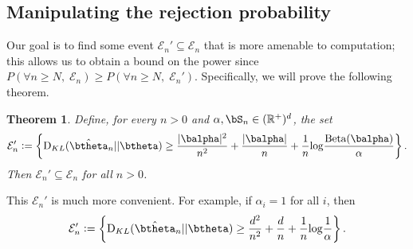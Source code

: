 \documentclass[11pt]{article}
\def\log{{\rm log}}
\newcommand{\Reals}{\mathbb R}
\newcommand{\Beta}{\mathrm{Beta}}
\newcommand{\KL}{\mathrm{D}_{KL}}
\newtheorem{thm}{Theorem}[section]
\newcommand{\df}{\vcentcolon=}
\begin{document}
\subsection{Manipulating the rejection probability}
Our goal is to find some event $\mathcal E_n'\subseteq \mathcal E_n$ that is more amenable to computation; this allows us to obtain a bound on the power since
$P(\forall n \geq N,\; \mathcal E_n) \geq P(\forall n \geq N,\; \mathcal E_n')$.
 Specifically, we will prove the following theorem.
\begin{thm}\label{thm:calEprime}
Define, for every $n>0$ and $\alpha, \bS_n\in(\Reals^+)^d$, the set
\begin{equation}
  \label{eq:decision_boundary}
  \mathcal E_n'\df
  \left\{
    \KL(\hat\btheta_n|| \btheta)
    \geq
      \frac{|\balpha|^2}{n^2} + \frac{|\balpha|}{n}
    +\frac{1}{n}\log\frac{\Beta(\balpha)}{\alpha}
  \right\}.
\end{equation}
Then $\mathcal E_n' \subseteq \mathcal E_n$ for all $n>0$.

\end{thm}
This $\mathcal E_n'$ is much more convenient.
For example, if $\alpha_i = 1$ for all $i$, then 
\begin{equation*}
  \mathcal E_n'\df
  \left\{
    \KL(\hat\btheta_n|| \btheta)
    \geq
    \frac{d^2}{n^2}
    +\frac{d}{n}
    +\frac{1}{n}\log\frac{1}{\alpha}
  \right\}.
\end{equation*}
\end{document}
